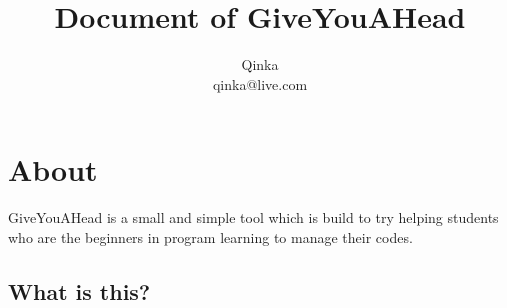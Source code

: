 \documentclass[UTF8]{article} %
\title{Document of GiveYouAHead}
\author{Qinka\\qinka@live.com}
\begin{document}
\maketitle
\newpage
\tableofcontents
\newpage
\section{About}
GiveYouAHead is a small and simple tool which is build to try helping students who are the beginners in program learning to manage their codes.
\subsection{What is this?}
\end{document}
